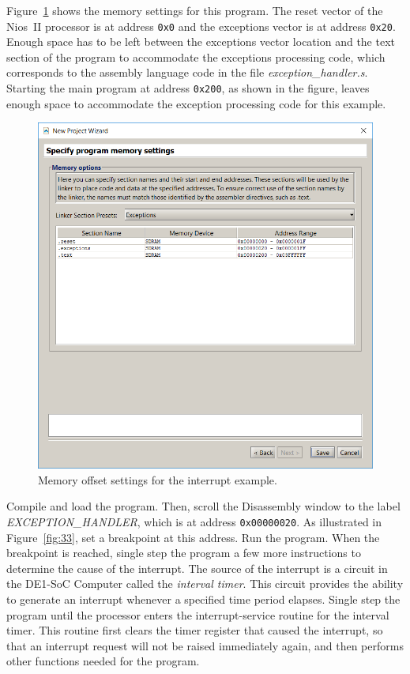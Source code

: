 \documentclass[11pt, twoside, pdftex]{article}
\begin{document}
 
Figure~\ref{fig:32} shows the memory settings for this program.
The reset vector of the Nios~II processor is at address 
\texttt{0x0} and the exceptions vector is at address 
\texttt{0x20}. Enough space has to be left between the exceptions
vector location and the text section of the program to
accommodate the exceptions processing code,
which corresponds to the assembly language code in the 
file {\it exception\_handler.s}. 
Starting the main program at address \texttt{0x200}, as shown
in the figure, leaves enough space to accommodate the exception
processing code for this example.

\begin{figure}[H]
   \begin{center}
      \includegraphics[scale=0.5]{screenshots/figure32.png}
   \end{center}
   \caption{Memory offset settings for the interrupt example.} 
	 \label{fig:32}
\end{figure}

Compile and load the program. Then, scroll the Disassembly window
to the label {\it EXCEPTION\_HANDLER}, which is at
address \texttt{0x00000020}.  
As illustrated in Figure~\ref{fig:33}, set a breakpoint at this address.
Run the program. When the breakpoint is reached, single step
the program a few more instructions to determine the cause of the
interrupt. The source of the interrupt is a circuit in the 
DE1-SoC Computer called the {\it interval timer}. This 
circuit provides the ability to generate an interrupt whenever a
specified time period elapses. Single step the program until the
processor enters the interrupt-service routine for the interval
timer. This routine first clears the timer register that caused
the interrupt, so that an interrupt request will not be raised
immediately again, and then performs other functions needed for
the program.
\end{document}
